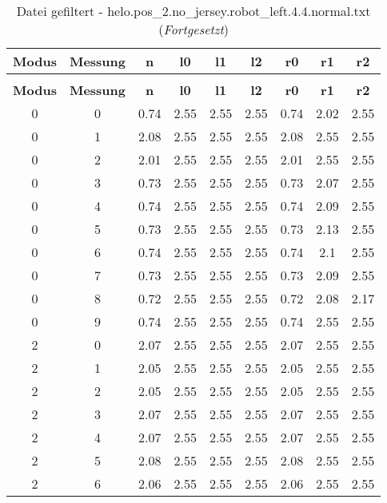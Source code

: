\begin{longtable}{|c|c||c||c|c|c||c|c|c|}
	\caption{Datei gefiltert - helo.pos\_2.no\_jersey.robot\_left.4.4.normal.txt} \label{tab:helo.pos-2.no-jersey.robot-left.4.4.normal.txt} \\ \hline
	\textbf{Modus} & \textbf{Messung} & \textbf{n} & \textbf{l0} & \textbf{l1} & \textbf{l2} & \textbf{r0} & \textbf{r1} & \textbf{r2}\\ \hline
	\endfirsthead
	\caption[]{Datei gefiltert - helo.pos\_2.no\_jersey.robot\_left.4.4.normal.txt (\emph{Fortgesetzt})} \\ \hline
	\textbf{Modus} & \textbf{Messung} & \textbf{n} & \textbf{l0} & \textbf{l1} & \textbf{l2} & \textbf{r0} & \textbf{r1} & \textbf{r2}\\ \hline
	\endhead
	0 & 0 & 0.74 & 2.55 & 2.55 & 2.55 & 0.74 & 2.02 & 2.55 \\ \hline
	0 & 1 & 2.08 & 2.55 & 2.55 & 2.55 & 2.08 & 2.55 & 2.55 \\ \hline
	0 & 2 & 2.01 & 2.55 & 2.55 & 2.55 & 2.01 & 2.55 & 2.55 \\ \hline
	0 & 3 & 0.73 & 2.55 & 2.55 & 2.55 & 0.73 & 2.07 & 2.55 \\ \hline
	0 & 4 & 0.74 & 2.55 & 2.55 & 2.55 & 0.74 & 2.09 & 2.55 \\ \hline
	0 & 5 & 0.73 & 2.55 & 2.55 & 2.55 & 0.73 & 2.13 & 2.55 \\ \hline
	0 & 6 & 0.74 & 2.55 & 2.55 & 2.55 & 0.74 & 2.1 & 2.55 \\ \hline
	0 & 7 & 0.73 & 2.55 & 2.55 & 2.55 & 0.73 & 2.09 & 2.55 \\ \hline
	0 & 8 & 0.72 & 2.55 & 2.55 & 2.55 & 0.72 & 2.08 & 2.17 \\ \hline
	0 & 9 & 0.74 & 2.55 & 2.55 & 2.55 & 0.74 & 2.55 & 2.55 \\ \hline
	2 & 0 & 2.07 & 2.55 & 2.55 & 2.55 & 2.07 & 2.55 & 2.55 \\ \hline
	2 & 1 & 2.05 & 2.55 & 2.55 & 2.55 & 2.05 & 2.55 & 2.55 \\ \hline
	2 & 2 & 2.05 & 2.55 & 2.55 & 2.55 & 2.05 & 2.55 & 2.55 \\ \hline
	2 & 3 & 2.07 & 2.55 & 2.55 & 2.55 & 2.07 & 2.55 & 2.55 \\ \hline
	2 & 4 & 2.07 & 2.55 & 2.55 & 2.55 & 2.07 & 2.55 & 2.55 \\ \hline
	2 & 5 & 2.08 & 2.55 & 2.55 & 2.55 & 2.08 & 2.55 & 2.55 \\ \hline
	2 & 6 & 2.06 & 2.55 & 2.55 & 2.55 & 2.06 & 2.55 & 2.55 \\ \hline

\end{longtable}
